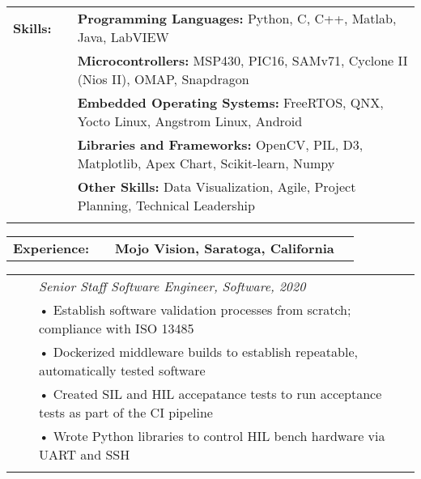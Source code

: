 \documentclass{minimal}
\begin{document}

\begin{center}
\fontsize{14}{12.8}\selectfont
\name\\
\fontsize{10}{12}\selectfont
\address\\
\phone\\
\email\\
\github\\
\end{center}
\vspace{0.5cm}

\begin{tabular}{ p{1.5cm} p{1cm} p{16cm} }
\textbf{Skills:} & & \textbf{Programming Languages:} Python, C, C++, Matlab, Java, LabVIEW\\
& & \textbf{Microcontrollers:} MSP430, PIC16, SAMv71, Cyclone II (Nios II), OMAP, Snapdragon\\
& & \textbf{Embedded Operating Systems:} FreeRTOS, QNX, Yocto Linux, Angstrom Linux, Android\\
& & \textbf{Libraries and Frameworks:} OpenCV, PIL, D3, Matplotlib, Apex Chart, Scikit-learn, Numpy\\
& & \textbf{Other Skills:} Data Visualization, Agile, Project Planning, Technical Leadership\\
& & \\
\end{tabular}

\begin{tabular}{ p{1.5cm} p{1cm} p{16cm} >{\raggedleft\arraybackslash}p{3cm} }
\textbf{Experience:} & & \textbf{Mojo Vision, Saratoga, California} & \\
\end{tabular}

\begin{tabular}{ p{1.5cm} p{1cm} p{16cm} >{\raggedleft\arraybackslash}p{3cm} }
& & \textit{Senior Staff Software Engineer, Software, 2020}\\
& & • Establish software validation processes from scratch; compliance with ISO 13485\\
& & • Dockerized middleware builds to establish repeatable, automatically tested software\\
& & • Created SIL and HIL accepatance tests to run acceptance tests as part of the CI pipeline\\
& & • Wrote Python libraries to control HIL bench hardware via UART and SSH\\
& & \\
\end{tabular}
\end{document}
